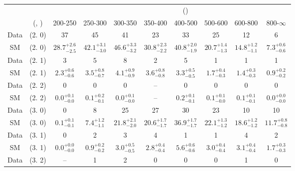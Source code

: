 \begin{table}[h!]
\tiny
\centering
{}
\begin{tabular}
{cccccccccc}
	\hline\hline
&	&	& \multicolumn{8}{c}{\scalht (\gev)}\\ 
	&	 (\njet, \nb) & 200-250 & 250-300 & 300-350 & 350-400 & 400-500 & 500-600 & 600-800 & 800-$\infty$ \\ [0.8ex] 
\hline
	Data & (2. 0) & 37 & 45 & 41 & 23 & 33 & 25 & 12 & 6 \\[0.5ex] 
	SM & (2. 0) & $28.7^{+ 2.6 }_{- 2.5 }$ & $42.1^{+ 3.1 }_{- 3.0 }$ & $46.6^{+ 3.3 }_{- 3.2 }$ & $30.8^{+ 2.3 }_{- 2.2 }$ & $40.8^{+ 2.0 }_{- 1.9 }$ & $20.7^{+ 1.4 }_{- 1.3 }$ & $14.8^{+ 1.2 }_{- 1.1 }$ & $7.3^{+ 0.6 }_{- 0.6 }$ \\[0.5ex] 
	Data & (2. 1) & 3 & 5 & 8 & 2 & 5 & 1 & 1 & 1 \\[0.5ex] 
	SM & (2. 1) & $2.3^{+ 0.6 }_{- 0.6 }$ & $3.5^{+ 0.8 }_{- 0.7 }$ & $4.1^{+ 0.9 }_{- 0.9 }$ & $3.6^{+ 0.8 }_{- 0.8 }$ & $3.3^{+ 0.5 }_{- 0.5 }$ & $1.7^{+ 0.4 }_{- 0.3 }$ & $1.4^{+ 0.3 }_{- 0.3 }$ & $0.9^{+ 0.2 }_{- 0.2 }$ \\[0.5ex] 
	Data & (2. 2) & 0 & 0 & 0 & -- & 0 & 0 & 0 & 0 \\[0.5ex] 
	SM & (2. 2) & $0.0^{+ 0.1 }_{- 0.0 }$ & $0.1^{+ 0.2 }_{- 0.1 }$ & $0.0^{+ 0.1 }_{- 0.0 }$ & -- & $0.2^{+ 0.1 }_{- 0.1 }$ & $0.1^{+ 0.1 }_{- 0.0 }$ & $0.1^{+ 0.1 }_{- 0.1 }$ & $0.0^{+ 0.0 }_{- 0.0 }$ \\[0.5ex] 
	Data & (3. 0) & 0 & 8 & 25 & 27 & 30 & 23 & 10 & 10 \\[0.5ex] 
	SM & (3. 0) & $0.1^{+ 0.1 }_{- 0.1 }$ & $7.4^{+ 1.2 }_{- 1.1 }$ & $21.8^{+ 2.1 }_{- 2.0 }$ & $20.6^{+ 1.7 }_{- 1.7 }$ & $36.9^{+ 1.7 }_{- 1.7 }$ & $22.1^{+ 1.3 }_{- 1.2 }$ & $18.6^{+ 1.2 }_{- 1.2 }$ & $11.7^{+ 0.8 }_{- 0.8 }$ \\[0.5ex] 
	Data & (3. 1) & 0 & 2 & 3 & 4 & 1 & 1 & 4 & 2 \\[0.5ex] 
	SM & (3. 1) & $0.0^{+ 0.0 }_{- 0.0 }$ & $0.9^{+ 0.2 }_{- 0.2 }$ & $3.0^{+ 0.5 }_{- 0.5 }$ & $2.8^{+ 0.4 }_{- 0.4 }$ & $5.6^{+ 0.6 }_{- 0.6 }$ & $3.0^{+ 0.4 }_{- 0.4 }$ & $3.1^{+ 0.4 }_{- 0.4 }$ & $1.7^{+ 0.3 }_{- 0.3 }$ \\[0.5ex] 
	Data & (3. 2) & -- & 1 & 2 & 0 & 0 & 0 & 1 & 0 \\[0.5ex] 

\end{tabular}
\end{table}
